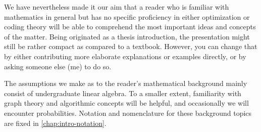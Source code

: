 \documentclass[
  paper=a4,
  parskip=half,
  english,
  fontsize=11pt,
  DIV=9,
  twoside=true,
  toc=bib,
  numbers=noendperiod
]{scrbook}
\theoremstyle{change}
\theoremstyle{nonumberplain}
\begin{document}
We have nevertheless made it our aim that a reader who is familiar with mathematics in general but has no specific proficiency in either optimization or coding theory will be able to comprehend the most important ideas and concepts of the matter. Being originated as a thesis introduction, the presentation might still be rather compact as compared to a textbook. However, you can change that by either contributing more elaborate explanations or examples directly, or by asking someone else (\eg me) to do so.

The assumptions we make as to the reader's mathematical background mainly consist of undergraduate linear algebra. To a smaller extent, familiarity with graph theory and algorithmic concepts will be helpful, and occasionally we will encounter probabilities. Notation and nomenclature for these background topics are fixed in \cref{chap:intro-notation}.





\printbibliography[heading=bibintoc]
\end{document}
